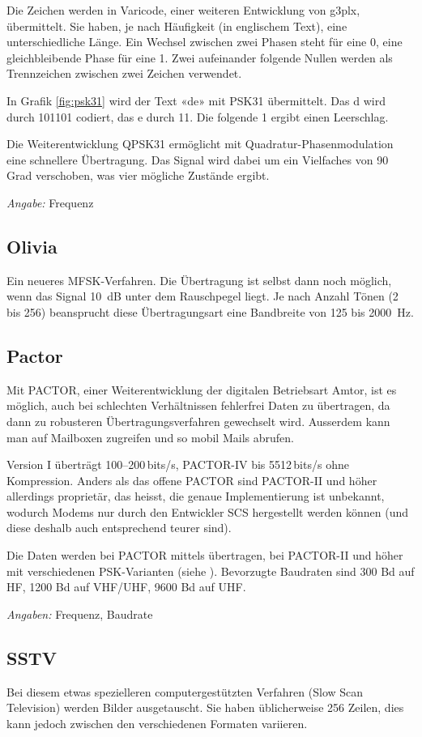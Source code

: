 Die Zeichen werden in Varicode, einer weiteren Entwicklung von g3plx, übermittelt. Sie haben, je nach Häufigkeit (in englischem Text), eine unterschiedliche Länge. Ein Wechsel zwischen zwei Phasen steht für eine 0, eine gleichbleibende Phase für eine 1. Zwei aufeinander folgende Nullen werden als Trennzeichen zwischen zwei Zeichen verwendet.

In Grafik \ref{fig:psk31} wird der Text «de» mit PSK31 übermittelt. Das d wird durch 101101 codiert, das e durch 11. Die folgende 1 ergibt einen Leerschlag.

Die Weiterentwicklung QPSK31 ermöglicht mit Quadratur-Phasenmodulation eine schnellere Übertragung. Das Signal wird dabei um ein Vielfaches von 90 Grad verschoben, was vier mögliche Zustände ergibt. 

\textit{Angabe:} Frequenz

\subsection{Olivia}
Ein neueres MFSK-Verfahren. Die Übertragung ist selbst dann noch möglich, wenn das Signal 10 dB unter dem Rauschpegel liegt. Je nach Anzahl Tönen (2 bis 256) beansprucht diese Übertragungsart eine Bandbreite von 125 bis 2000 Hz.

\subsection{Pactor}
Mit PACTOR, einer Weiterentwicklung der digitalen Betriebsart Amtor, ist es möglich, auch bei schlechten Verhältnissen fehlerfrei Daten zu übertragen, da dann zu robusteren Übertragungsverfahren gewechselt wird. Ausserdem kann man auf Mailboxen zugreifen und so mobil Mails abrufen.

Version I überträgt 100--200\,bits/s, PACTOR-IV bis 5512\,bits/s ohne Kompression. Anders als das offene PACTOR sind PACTOR-II und höher allerdings proprietär, das heisst, die genaue Implementierung ist unbekannt, wodurch Modems nur durch den Entwickler SCS hergestellt werden können (und diese deshalb auch entsprechend teurer sind).

Die Daten werden bei PACTOR mittels  übertragen, bei PACTOR-II und höher mit verschiedenen PSK-Varianten (siehe ). Bevorzugte Baudraten sind 300 Bd auf HF, 1200 Bd auf VHF/UHF, 9600 Bd auf UHF.

\textit{Angaben:} Frequenz, Baudrate

\subsection{SSTV}
Bei diesem etwas spezielleren computergestützten Verfahren (Slow Scan Television) werden Bilder ausgetauscht. Sie haben üblicherweise 256 Zeilen, dies kann jedoch zwischen den verschiedenen Formaten variieren.

